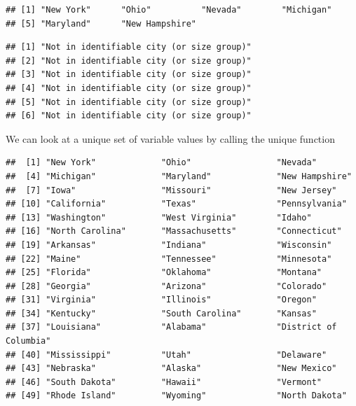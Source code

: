 \documentclass[]{book}
\newenvironment{Shaded}{\begin{snugshade}}{\end{snugshade}}
\newcommand{\KeywordTok}[1]{\textcolor[rgb]{0.13,0.29,0.53}{\textbf{#1}}}
\newcommand{\NormalTok}[1]{#1}
\newcommand{\OperatorTok}[1]{\textcolor[rgb]{0.81,0.36,0.00}{\textbf{#1}}}
\theoremstyle{definition}
\theoremstyle{definition}
\theoremstyle{definition}
\theoremstyle{remark}
\begin{document}
\begin{verbatim}
## [1] "New York"      "Ohio"          "Nevada"        "Michigan"     
## [5] "Maryland"      "New Hampshire"
\end{verbatim}

\begin{Shaded}
\end{Shaded}

\begin{verbatim}
## [1] "Not in identifiable city (or size group)"
## [2] "Not in identifiable city (or size group)"
## [3] "Not in identifiable city (or size group)"
## [4] "Not in identifiable city (or size group)"
## [5] "Not in identifiable city (or size group)"
## [6] "Not in identifiable city (or size group)"
\end{verbatim}

We can look at a unique set of variable values by calling the unique function

\begin{Shaded}
\end{Shaded}

\begin{verbatim}
##  [1] "New York"             "Ohio"                 "Nevada"              
##  [4] "Michigan"             "Maryland"             "New Hampshire"       
##  [7] "Iowa"                 "Missouri"             "New Jersey"          
## [10] "California"           "Texas"                "Pennsylvania"        
## [13] "Washington"           "West Virginia"        "Idaho"               
## [16] "North Carolina"       "Massachusetts"        "Connecticut"         
## [19] "Arkansas"             "Indiana"              "Wisconsin"           
## [22] "Maine"                "Tennessee"            "Minnesota"           
## [25] "Florida"              "Oklahoma"             "Montana"             
## [28] "Georgia"              "Arizona"              "Colorado"            
## [31] "Virginia"             "Illinois"             "Oregon"              
## [34] "Kentucky"             "South Carolina"       "Kansas"              
## [37] "Louisiana"            "Alabama"              "District of Columbia"
## [40] "Mississippi"          "Utah"                 "Delaware"            
## [43] "Nebraska"             "Alaska"               "New Mexico"          
## [46] "South Dakota"         "Hawaii"               "Vermont"             
## [49] "Rhode Island"         "Wyoming"              "North Dakota"
\end{verbatim}
\end{document}
